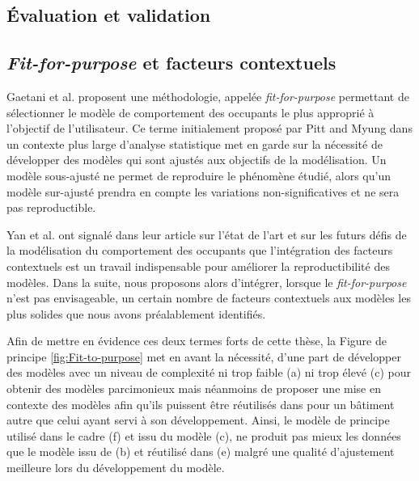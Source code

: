 \subsection{Évaluation et validation}

\subsection{\textit{Fit-for-purpose} et facteurs contextuels}

Gaetani et al. \cite{Gaetani-16} proposent une méthodologie, appelée \textit{fit-for-purpose} permettant de sélectionner le modèle de comportement des occupants le plus approprié à l'objectif de l'utilisateur. Ce terme initialement proposé par Pitt and Myung \cite{Pitt-02} dans un contexte plus large d'analyse statistique met en garde sur la nécessité de développer des modèles qui sont ajustés aux objectifs de la modélisation. Un modèle sous-ajusté ne permet de reproduire le phénomène étudié, alors qu'un modèle sur-ajusté prendra en compte les variations non-significatives et ne sera pas reproductible. 

Yan et al. \cite{Yan-15} ont signalé dans leur article sur l'état de l'art et sur les futurs défis de la modélisation du comportement des occupants que l'intégration des facteurs contextuels est un travail indispensable pour améliorer la reproductibilité des modèles. Dans la suite, nous proposons alors d'intégrer, lorsque le \textit{fit-for-purpose} n'est pas envisageable, un certain nombre de facteurs contextuels aux modèles les plus solides que nous avons préalablement identifiés.

Afin de mettre en évidence ces deux termes forts de cette thèse, la Figure de principe \ref{fig:Fit-to-purpose} met en avant la nécessité, d'une part de développer des modèles avec un niveau de complexité ni trop faible (a) ni trop élevé (c) pour obtenir des modèles parcimonieux mais néanmoins de proposer une mise en contexte des modèles afin qu'ils puissent être réutilisés dans pour un bâtiment autre que celui ayant servi à son développement. Ainsi, le modèle de principe utilisé dans le cadre (f) et issu du modèle (c), ne produit pas mieux les données que le modèle issu de (b) et réutilisé dans (e) malgré une qualité d'ajustement meilleure lors du développement du modèle.

